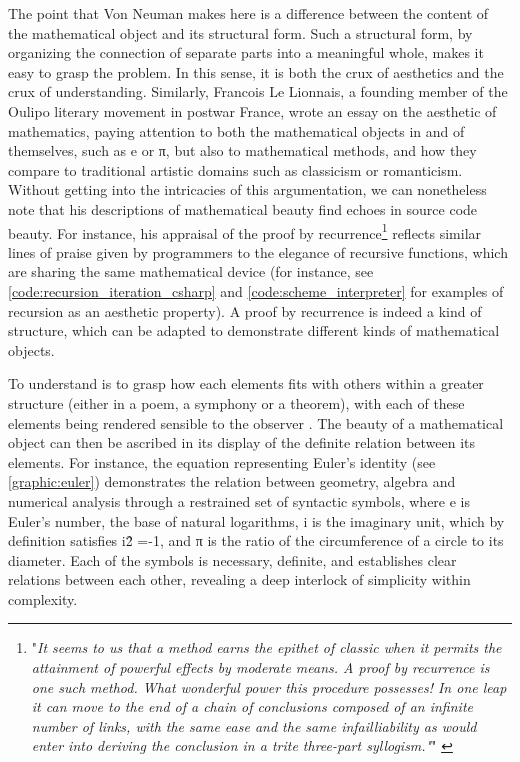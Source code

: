 The point that Von Neuman makes here is a difference between the content of the mathematical object and its structural form. Such a structural form, by organizing the connection of separate parts into a meaningful whole, makes it easy to grasp the problem. In this sense, it is both the crux of aesthetics and the crux of understanding. Similarly, Francois Le Lionnais, a founding member of the Oulipo literary movement in postwar France, wrote an essay on the aesthetic of mathematics, paying attention to both the mathematical objects in and of themselves, such as e or π, but also to mathematical methods, and how they compare to traditional artistic domains such as classicism or romanticism. Without getting into the intricacies of this argumentation, we can nonetheless note that his descriptions of mathematical beauty find echoes in source code beauty. For instance, his appraisal of the proof by recurrence\footnote{"\emph{It seems to us that a method earns the epithet of classic when it permits the attainment of powerful effects by moderate means. A proof by recurrence is one such method. What wonderful power this procedure possesses! In one leap it can move to the end of a chain of conclusions composed of an infinite number of links, with the same ease and the same infailliability as would enter into deriving the conclusion in a trite three-part syllogism."}" \citep{lelionnais_great_1971}} reflects similar lines of praise given by programmers to the elegance of recursive functions, which are sharing the same mathematical device (for instance, see \ref{code:recursion_iteration_csharp} and \ref{code:scheme_interpreter} for examples of recursion as an aesthetic property). A proof by recurrence is indeed a kind of structure, which can be adapted to demonstrate different kinds of mathematical objects.

To understand is to grasp how each elements fits with others within a greater structure (either in a poem, a symphony or a theorem), with each of these elements being rendered sensible to the observer \citep{cellucci_mathematical_2015}. The beauty of a mathematical object can then be ascribed in its display of the definite relation between its elements. For instance, the equation representing Euler's identity (see \ref{graphic:euler}) demonstrates the relation between geometry, algebra and numerical analysis through a restrained set of syntactic symbols, where e is Euler's number, the base of natural logarithms, i is the imaginary unit, which by definition satisfies i\^{2} =-1, and π is the ratio of the circumference of a circle to its diameter. Each of the symbols is necessary, definite, and establishes clear relations between each other, revealing a deep interlock of simplicity within complexity.

